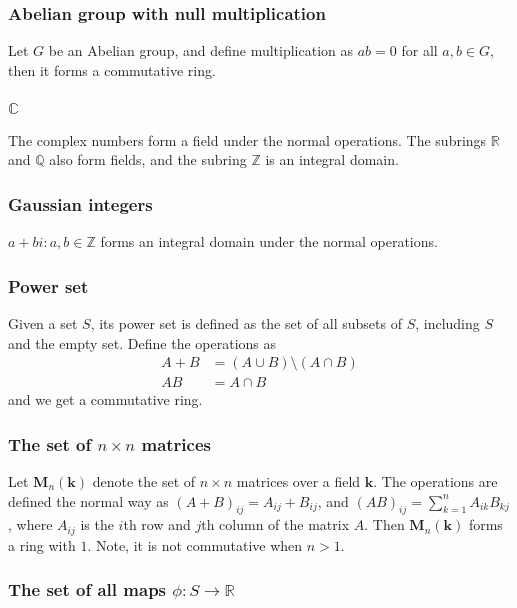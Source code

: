   \subsubsection{Abelian group with null multiplication}
  Let $G$ be an Abelian group, and define multiplication as $ab = 0$ for all $a, b \in G$,
  then it forms a commutative ring.

  \subsubsection{$\mathbb{C}$}
  The complex numbers form a field under the normal operations. The subrings
  $\mathbb{R}$ and $\mathbb{Q}$ also form fields, and the subring $\mathbb{Z}$
  is an integral domain.

  \subsubsection{Gaussian integers}
  ${a + bi : a, b \in \mathbb{Z}}$ forms an integral domain under the normal operations.

  \subsubsection{Power set}
  Given a set $S$, its power set is defined as the set of all subsets of $S$,
  including $S$ and the empty set. Define the operations as
  \begin{align*}
    A + B &= (A \cup B) \setminus (A \cap B)\\
    AB &= A \cap B
  \end{align*}
  and we get a commutative ring.

  \subsubsection{The set of $n \times n$ matrices}
  Let $\mathbf{M}_{n}(\mathbf{k})$ denote the set of $n \times n$ matrices over
  a field $\mathbf{k}$. The operations are defined the normal way as $(A +
  B)_{ij} = A_{ij} + B_{ij}$, and $(AB)_{ij} = \sum_{k=1}^{n} A_{ik} B_{kj}$,
  where $A_{ij}$ is the $i$th row and $j$th column of the matrix $A$. Then
  $\mathbf{M}_{n}(\mathbf{k})$ forms a ring with $1$. Note, it is not
  commutative when $n > 1$.

  \subsubsection{The set of all maps $\phi : S \to \mathbb{R}$}




